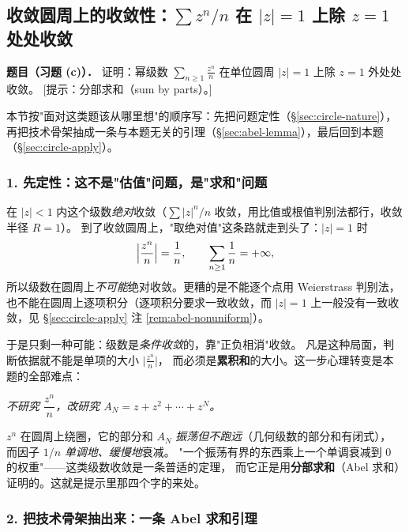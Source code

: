 \subsection{收敛圆周上的收敛性：$\sum z^n/n$ 在 $|z|=1$ 上除 $z=1$ 处处收敛}
\label{sec:circle-convergence}

\noindent\textbf{题目（习题 (c)）．}
证明：幂级数 $\displaystyle\sum_{n\ge1}\frac{z^n}{n}$ 在单位圆周 $|z|=1$ 上除 $z=1$ 外处处收敛。
\hfill{\small [提示：分部求和（sum by parts）。]}

\medskip
\noindent
本节按"面对这类题该从哪里想"的顺序写：先把问题定性（\S\ref{sec:circle-nature}），
再把技术骨架抽成一条与本题无关的引理（\S\ref{sec:abel-lemma}），最后回到本题（\S\ref{sec:circle-apply}）。

\subsubsection*{1. 先定性：这不是"估值"问题，是"求和"问题}
\label{sec:circle-nature}

在 $|z|<1$ 内这个级数\emph{绝对}收敛（$\sum|z|^n/n$ 收敛，用比值或根值判别法都行，收敛半径 $R=1$）。
到了收敛圆周上，"取绝对值"这条路就走到头了：$|z|=1$ 时
\[
\Bigl|\frac{z^n}{n}\Bigr|=\frac1n,
\qquad
\sum_{n\ge1}\frac1n=+\infty,
\]
所以级数在圆周上\emph{不可能}绝对收敛。更糟的是不能逐个点用 Weierstrass 判别法，
也不能在圆周上逐项积分（逐项积分要求一致收敛，而 $|z|=1$ 上一般没有一致收敛，见 \S\ref{sec:circle-apply} 注 \ref{rem:abel-nonuniform}）。

于是只剩一种可能：级数是\emph{条件收敛}的，靠"正负相消"收敛。
凡是这种局面，判断依据就不能是单项的大小 $\bigl|\frac{z^n}{n}\bigr|$，
而必须是\textbf{累积和}的大小。这一步心理转变是本题的全部难点：

\begin{center}
\emph{不研究 $\dfrac{z^n}{n}$，改研究 $A_N=z+z^2+\cdots+z^N$。}
\end{center}

$z^n$ 在圆周上绕圈，它的部分和 $A_N$ \emph{振荡但不跑远}（几何级数的部分和有闭式），
而因子 $1/n$ \emph{单调地、缓慢地}衰减。
"一个振荡有界的东西乘上一个单调衰减到 $0$ 的权重"——这类级数收敛是一条普适的定理，
而它正是用\textbf{分部求和}（Abel 求和）证明的。这就是提示里那四个字的来处。

\subsubsection*{2. 把技术骨架抽出来：一条 Abel 求和引理}
\label{sec:abel-lemma}

